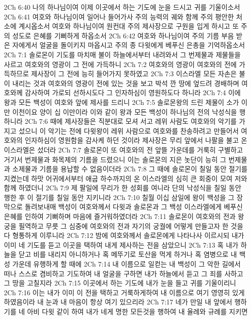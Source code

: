 2Ch 6:40  나의 하나님이여 이제 이곳에서 하는 기도에 눈을 드시고 귀를 기울이소서
2Ch 6:41  여호와 하나님이여 일어나 들어가사 주의 능력의 궤와 함께 주의 평안한 처소에 계시옵소서 여호와 하나님이여 원컨대 주의 제사장으로 구원을 입게 하시고 또 주의 성도로 은혜를 기뻐하게 하옵소서
2Ch 6:42  여호와 하나님이여 주의 기름 부음 받은 자에게서 얼굴을 돌이키지 마옵시고 주의 종 다윗에게 베푸신 은총을 기억하옵소서
2Ch 7:1  솔로몬이 기도를 마치매 불이 하늘에서부터 내려와서 그 번제물과 제물들을 사르고 여호와의 영광이 그 전에 가득하니
2Ch 7:2  여호와의 영광이 여호와의 전에 가득하므로 제사장이 그 전에 능히 들어가지 못하였고
2Ch 7:3  이스라엘 모든 자손은 불이 내리는 것과 여호와의 영광이 전에 있는 것을 보고 박석 깐 땅에 엎드려 경배하며 여호와께 감사하여 가로되 선하시도다 그 인자하심이 영원하도다 하니라
2Ch 7:4  이에 왕과 모든 백성이 여호와 앞에 제사를 드리니
2Ch 7:5  솔로몬왕의 드린 제물이 소가 이만 이천이요 양이 십 이만이라 이와 같이 왕과 모든 백성이 하나님의 전의 낙성식을 행하니라
2Ch 7:6  때에 제사장들은 직분대로 모셔 서고 레위 사람도 여호와의 악기를 가지고 섰으니 이 악기는 전에 다윗왕이 레위 사람으로 여호와를 찬송하려고 만들어서 여호와의 인자하심이 영원함을 감사케 하던 것이라 제사장은 무리 앞에서 나팔을 불고 온 이스라엘은 섰더라
2Ch 7:7  솔로몬이 또 여호와의 전 앞뜰 가운데를 거룩히 구별하고 거기서 번제물과 화목제의 기름을 드렸으니 이는 솔로몬의 지은 놋단이 능히 그 번제물과 소제물과 기름을 용납할 수 없음이더라
2Ch 7:8  그 때에 솔로몬이 칠일 동안 절기를 지켰는데 하맛 어귀에서부터 애굽 하수까지의 온 이스라엘의 심히 큰 회중이 모여 저와 함께 하였더니
2Ch 7:9  제 팔일에 무리가 한 성회를 여니라 단의 낙성식을 칠일 동안 행한 후 이 절기를 칠일 동안 지키니라
2Ch 7:10  칠월 이십 삼일에 왕이 백성을 그 장막으로 돌려보내매 백성이 여호와께서 다윗과 솔로몬과 그 백성 이스라엘에게 베푸신 은혜를 인하여 기뻐하며 마음에 즐거워하였더라
2Ch 7:11  솔로몬이 여호와의 전과 왕궁을 필역하고 무릇 그 심중에 여호와의 전과 자기의 궁궐에 어떻게 만들고자 한 것을 다 형통하게 이루니라
2Ch 7:12  밤에 여호와께서 솔로몬에게 나타나사 이르시되 내가 이미 네 기도를 듣고 이곳을 택하여 내게 제사하는 전을 삼았으니
2Ch 7:13  혹 내가 하늘을 닫고 비를 내리지 아니하거나 혹 메뚜기로 토산을 먹게 하거나 혹 염병으로 내 백성 가운데 유행하게 할 때에
2Ch 7:14  내 이름으로 일컫는 내 백성이 그 악한 길에서 떠나 스스로 겸비하고 기도하여 내 얼굴을 구하면 내가 하늘에서 듣고 그 죄를 사하고 그 땅을 고칠지라
2Ch 7:15  이곳에서 하는 기도에 내가 눈을 들고 귀를 기울이리니
2Ch 7:16  이는 내가 이미 이 전을 택하고 거룩하게하여 내 이름으로 여기 영영히 있게 하였음이라 내 눈과 내 마음이 항상 여기 있으리라
2Ch 7:17  네가 만일 내 앞에서 행하기를 네 아비 다윗 같이 하여 내가 네게 명한 모든것을 행하여 내 율례와 규례를 지키면
